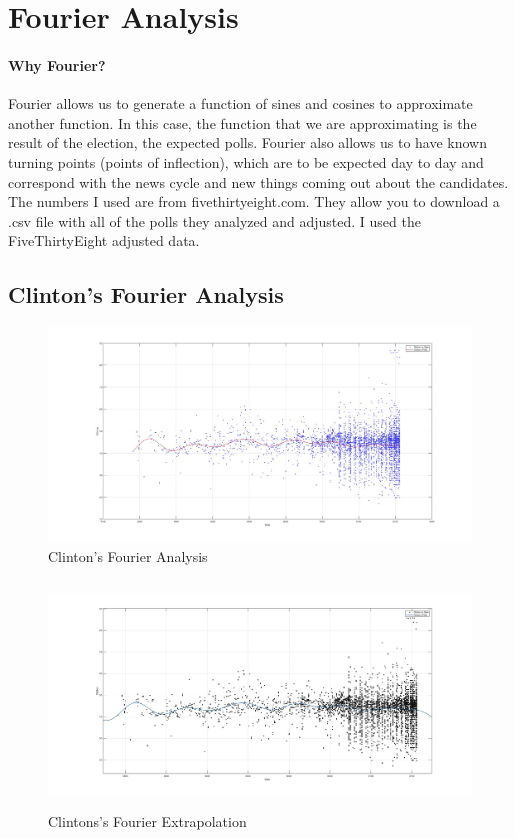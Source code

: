 \documentclass[twoside]{article}
\begin{document}
              \section{Fourier Analysis}
              \vskip4cm
              \paragraph{Why Fourier?} Fourier allows us to generate a function of sines and cosines to approximate another function. In this case, the function that we are approximating
              is the result of the election, the expected polls. Fourier also allows us to have known turning points (points of inflection), which are to be expected day to day and correspond
              with the news cycle and new things coming out about the candidates. The numbers I used are from fivethirtyeight.com. They allow you to download a .csv file with all of the polls they
              analyzed and adjusted. I used the FiveThirtyEight adjusted data.

              \newpage
              \subsection{Clinton's Fourier Analysis}
              \begin{figure}[H]
                \centering
                \includegraphics[width=\textwidth]{images/fourier/clinton.jpg}
                \caption{Clinton's Fourier Analysis}
              \end{figure}
              \begin{figure}[H]
                \centering
                \includegraphics[width=\textwidth,height=6cm]{images/fourier/clintonlarge.jpg}
                \caption{Clintons's Fourier Extrapolation}
              \end{figure}
\end{document}
